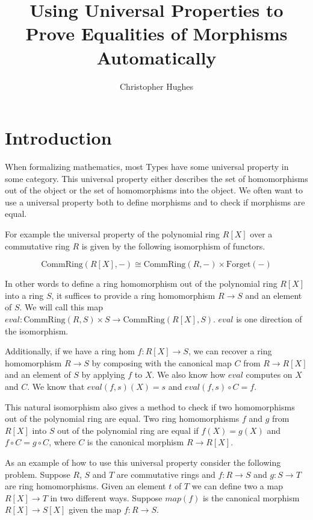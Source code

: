 \documentclass[12pt]{article} %
\title{Using Universal Properties to Prove Equalities of Morphisms Automatically}
\author{Christopher Hughes}
\theoremstyle{definition}
\theoremstyle{definition}
\theoremstyle{definition}
\theoremstyle{definition}
\begin{document}
\section{Introduction}


When formalizing mathematics, most Types have some universal property in some
category. This universal property either describes the set of homomorphisms out of
the object or the set of homomorphisms into the object. We often want to use a universal
property both to define morphisms and to check if morphisms are equal.

For example the universal property of the polynomial ring $R[X]$ over
a commutative ring $R$ is given by the following isomorphism of functors.

\begin{equation}
\text{CommRing}(R[X], -) \cong \text{CommRing}(R, -) \times \text{Forget}(-)
\end{equation}

In other words to define a ring homomorphism out of the polynomial ring $R[X]$
into a ring $S$, it suffices to provide a ring homomorphism $R \to S$ and
an element of $S$. We will call this map
$eval : \text{CommRing}(R, S) \times S \to \text{CommRing}(R[X],S)$.
$eval$ is one direction of the isomorphism.

Additionally, if we have a ring hom $f : R[X] \to S$, we can recover
a ring homomorphism $R \to S$ by composing with the canonical map
$C$ from $R \to R[X]$ and an element of $S$ by applying $f$ to $X$.
We also know how $eval$ computes on $X$ and $C$. We know that
$eval(f, s)(X) = s$ and $eval(f, s) \circ C = f$.

This natural isomorphism also gives a method to check if two
homomorphisms out of the polynomial ring are equal. Two ring homomorphisms
$f$ and $g$ from $R[X]$ into $S$ out of the polynomial ring are equal if
$f(X) = g(X)$ and $f \circ C = g \circ C$, where $C$ is the canonical
morphism $R \to R[X]$.

As an example of how to use this universal property consider the following
problem. Suppose $R$, $S$ and $T$ are commutative rings and $f : R \to S$ and
$g : S \to T$ are ring homomorphisms. Given an element $t$ of $T$ we can define
two a map $R[X] \to T$ in two different ways. Suppose $map(f)$ is the canonical
morphism $R[X] \to S[X]$ given the map $f : R \to S$.
\end{document}
